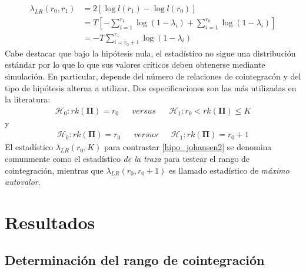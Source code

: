 \documentclass[12pt, twoside]{book}\usepackage[]{graphicx}\usepackage[]{color}
\let\bold\boldsymbol
\numberwithin{equation}{section}
\numberwithin{theorem}{section}
\numberwithin{teorema}{section}
\numberwithin{defi}{section}
\numberwithin{prop}{section}
\numberwithin{defi}{section}
\theoremstyle{plain}
\begin{document}
\begin{align}
\lambda_{LR}(r_{0},r_{1}) & = 2[\log l(r_{1})-\log l(r_{0})] \nonumber \\ 
                          & = T\left[-\sum_{i=1}^{r_{1}}\log(1-\lambda_{i})+\sum_{i=1}^{r_{0}}\log(1-\lambda_{i})\right] \nonumber \\ 
                          & = -T\sum_{i=r_{0}+1}^{r_{1}}\log (1-\lambda_{i})
\end{align}
Cabe destacar que bajo la hipótesis nula, el estadístico no sigue una distribución estándar por lo que lo que sus valores críticos deben obtenerse mediante simulación. En particular, depende del número de relaciones de cointegracón y del tipo de hipótesis alterna a utilizar. Dos especificaciones son las más utilizadas en la literatura: 
\begin{align}
\mathcal{H}_{0}: rk(\bold{\Pi})=r_{0} &&  versus && \mathcal{H}_{1}: r_{0}<rk(\bold{\Pi})\leq K \label{hipo_johansen2}
\end{align}
y
\begin{align}
\mathcal{H}_{0}: rk(\bold{\Pi})=r_{0} &&  versus && \mathcal{H}_{1}: rk(\bold{\Pi})=r_{0}+1 \label{hipo_johansen3}
\end{align}
El estadístico $\lambda_{LR}(r_{0},K)$ para contrastar \eqref{hipo_johansen2} se denomina comunmente como el estadístico \textit{de la traza} para testear el rango de cointegración, mientras que $\lambda_{LR}(r_{0},r_{0}+1)$ es llamado estadístico de \textit{máximo autovalor}.  

\section{Resultados}
\subsection{Determinación del rango de cointegración}
\end{document}
